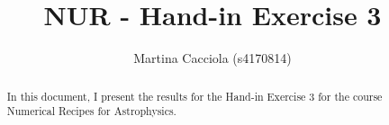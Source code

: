 \documentclass[a4paper,10pt]{article}
\title{NUR - Hand-in Exercise 3}
\author{Martina Cacciola (s4170814)}
\begin{document}
\maketitle

\begin{abstract}
 In this document, I present the results for the Hand-in Exercise 3 for the 
 course Numerical Recipes for Astrophysics.
\end{abstract}



\end{document}
